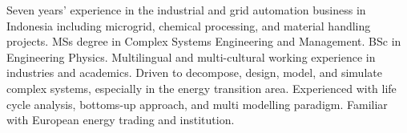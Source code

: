 %
%
%
\par{
Seven years’ experience in the industrial and grid automation business in
Indonesia including microgrid, chemical processing, and material handling projects. MSs degree in Complex Systems Engineering and Management. BSc in Engineering
Physics. Multilingual and multi-cultural working experience in industries and academics. Driven to decompose, design, model, and simulate complex systems, especially in the energy
transition area. Experienced with life cycle analysis, bottoms-up approach, and multi
modelling paradigm. Familiar with European energy trading and institution.
}
